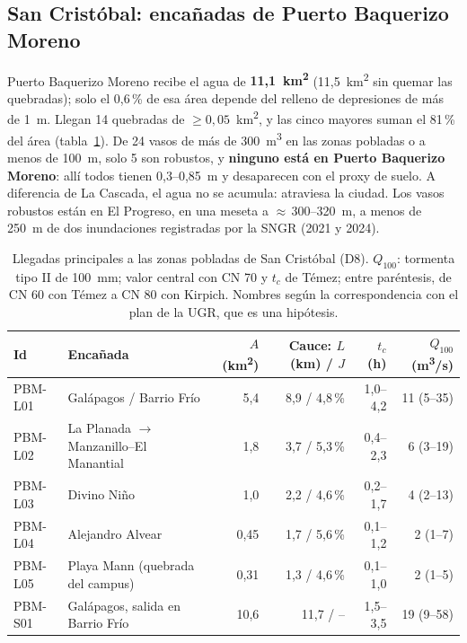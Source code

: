 \documentclass{sosg-informe}
\newcommand{\kmc}{km\textsuperscript{2}}
\newcommand{\mcs}{m\textsuperscript{3}/s}
\newcommand{\mtres}{m\textsuperscript{3}}
\begin{document}
\subsection{San Cristóbal: encañadas de Puerto Baquerizo Moreno}
Puerto Baquerizo Moreno recibe el agua de \textbf{11,1~\kmc} (11,5~\kmc{} sin quemar las quebradas); solo el 0,6\,\% de esa área depende del relleno de depresiones de más de 1~m. Llegan 14 quebradas de $\geq 0{,}05$~\kmc, y las cinco mayores suman el 81\,\% del área (tabla~\ref{tab:llegadas}). De 24 vasos de más de 300~\mtres{} en las zonas pobladas o a menos de 100~m, solo 5 son robustos, y \textbf{ninguno está en Puerto Baquerizo Moreno}: allí todos tienen 0,3--0,85~m y desaparecen con el proxy de suelo. A diferencia de La Cascada, el agua no se acumula: atraviesa la ciudad. Los vasos robustos están en El Progreso, en una meseta a ${\approx}\,300$--320~m, a menos de 250~m de dos inundaciones registradas por la SNGR (2021 y 2024).

\begin{table}[ht]
  \centering\small
  \caption{Llegadas principales a las zonas pobladas de San Cristóbal (D8). $Q_{100}$: tormenta tipo II de 100~mm; valor central con CN 70 y $t_c$ de Témez; entre paréntesis, de CN 60 con Témez a CN 80 con Kirpich. Nombres según la correspondencia con el plan de la UGR, que es una hipótesis.}
  \label{tab:llegadas}
  \begin{tabularx}{\linewidth}{l>{\raggedright\arraybackslash}Xrrrr}
    \toprule
    Id & Encañada & $A$ (\kmc) & Cauce: $L$ (km) / $J$ & $t_c$ (h) & $Q_{100}$ (\mcs) \\
    \midrule
    PBM-L01 & Galápagos / Barrio Frío & 5,4 & 8,9 / 4,8\,\% & 1,0--4,2 & 11 (5--35) \\
    PBM-L02 & La Planada $\to$ Manzanillo--El Manantial & 1,8 & 3,7 / 5,3\,\% & 0,4--2,3 & 6 (3--19) \\
    PBM-L03 & Divino Niño & 1,0 & 2,2 / 4,6\,\% & 0,2--1,7 & 4 (2--13) \\
    PBM-L04 & Alejandro Alvear & 0,45 & 1,7 / 5,6\,\% & 0,1--1,2 & 2 (1--7) \\
    PBM-L05 & Playa Mann (quebrada del campus) & 0,31 & 1,3 / 4,6\,\% & 0,1--1,0 & 2 (1--5) \\
    PBM-S01 & Galápagos, salida en Barrio Frío & 10,6 & 11,7 / -- & 1,5--3,5 & 19 (9--58) \\
    \bottomrule
  \end{tabularx}
\end{table}
\end{document}
